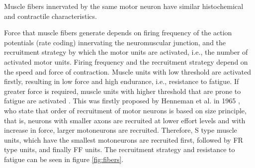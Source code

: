 Muscle fibers innervated by the same motor neuron have similar histochemical and contractile characteristics.

Force that muscle fibers generate depends on firing frequency of the action potentials (rate coding) innervating the neuromuscular junction, and the recruitment strategy by which the motor units are activated, i.e., the number of activated motor units. Firing frequency and the recruitment strategy depend on the speed and force of contraction. Muscle units with low threshold are activated firstly, resulting in low force and high endurance, i.e., resistance to fatigue. If greater force is required, muscle units with higher threshold that are prone to fatigue are activated \citep{Freund1975, Merletti-book}. This was firstly proposed by Henneman et al. in 1965 \citep{Henneman1965}, who state that order of recruitment of motor neurons is based on size principle, that is, neurons with smaller axons are recruited at lower effort levels and with increase in force, larger motoneurons are recruited. Therefore, S type muscle units, which have the smallest motoneurons are recruited first, followed by FR type units, and finally FF units. The recruitment strategy and resistance to fatigue can be seen in figure \ref{fig:fibers}. 

%

